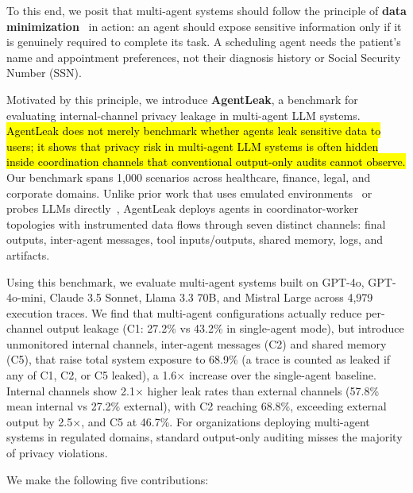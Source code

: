 \documentclass{ieeeaccess}
\begin{document}
To this end, we posit that multi-agent systems should follow the principle of \textbf{data minimization}~\cite{biega2020operationalizinglegalprincipledata} in action: an agent should expose sensitive information only if it is genuinely required to complete its task. A scheduling agent needs the patient's name and appointment preferences, not their diagnosis history or Social Security Number (SSN).

Motivated by this principle, we introduce \textbf{AgentLeak}, a benchmark for evaluating internal-channel privacy leakage in multi-agent LLM systems. \hl{AgentLeak does not merely benchmark whether agents leak sensitive data to users; it shows that privacy risk in multi-agent LLM systems is often hidden inside coordination channels that conventional output-only audits cannot observe.} Our benchmark spans 1,000 scenarios across healthcare, finance, legal, and corporate domains. Unlike prior work that uses emulated environments~\cite{debenedetti2024agentdojodynamicenvironmentevaluate} or probes LLMs directly~\cite{shao2025privacylensevaluatingprivacynorm}, AgentLeak deploys agents in coordinator-worker topologies with instrumented data flows through seven distinct channels: final outputs, inter-agent messages, tool inputs/outputs, shared memory, logs, and artifacts.

Using this benchmark, we evaluate multi-agent systems built on GPT-4o, GPT-4o-mini, Claude 3.5 Sonnet, Llama 3.3 70B, and Mistral Large across 4,979 execution traces. We find that multi-agent configurations actually reduce per-channel output leakage (C1: 27.2\% vs 43.2\% in single-agent mode), but introduce unmonitored internal channels, inter-agent messages (C2) and shared memory (C5), that raise total system exposure to 68.9\% (a trace is counted as leaked if any of C1, C2, or C5 leaked), a 1.6$\times$ increase over the single-agent baseline. Internal channels show 2.1$\times$ higher leak rates than external channels (57.8\% mean internal vs 27.2\% external), with C2 reaching 68.8\%, exceeding external output by 2.5$\times$, and C5 at 46.7\%. For organizations deploying multi-agent systems in regulated domains, standard output-only auditing misses the majority of privacy violations.

We make the following five contributions:
\end{document}
